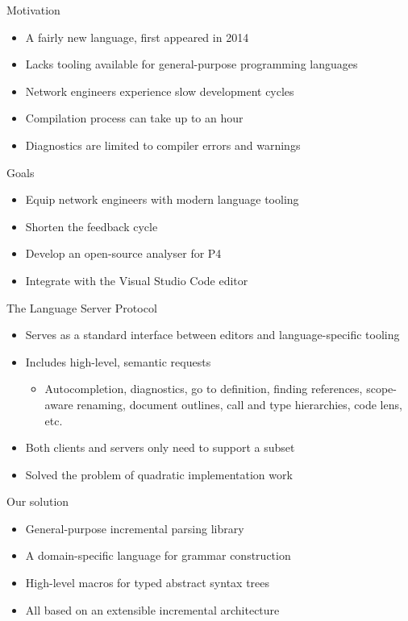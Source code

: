 \documentclass[aspectratio=169]{beamer}
\begin{document}
\begin{frame}{Motivation}
	\begin{itemize}
		\item A fairly new language, first appeared in 2014 \pause
		\item \alert{Lacks tooling} available for general-purpose programming
			languages \pause
		\item Network engineers experience slow development cycles \pause
		\item Compilation process can take up to an hour \pause
		\item Diagnostics are limited to compiler errors and warnings
	\end{itemize}
\end{frame}

\begin{frame}{Goals}
	\begin{itemize}
		\item Equip network engineers with modern language tooling \pause
		\item Shorten the feedback cycle \pause
		\item Develop an open-source analyser for P4 \pause
		\item Integrate with the Visual Studio Code editor
	\end{itemize}
\end{frame}

\begin{frame}{The Language Server Protocol}
	\begin{itemize}
		\item Serves as a standard interface between editors and
			language-specific tooling \pause
		\item Includes high-level, semantic requests
			\begin{itemize}
				\item Autocompletion, diagnostics, go to definition, finding
					references, scope-aware renaming, document outlines, call
					and type hierarchies, code lens, etc.
			\end{itemize} \pause
		\item Both clients and servers only need to support a subset \pause
		\item Solved the problem of quadratic implementation work
	\end{itemize}
\end{frame}

\begin{frame}{Our solution}
	\begin{itemize}
		\item General-purpose \alert{incremental parsing} library \pause
		\item A domain-specific language for grammar construction \pause
		\item High-level macros for \alert{typed abstract syntax trees} \pause
		\item All based on an extensible incremental architecture
	\end{itemize}
\end{frame}
\end{document}
